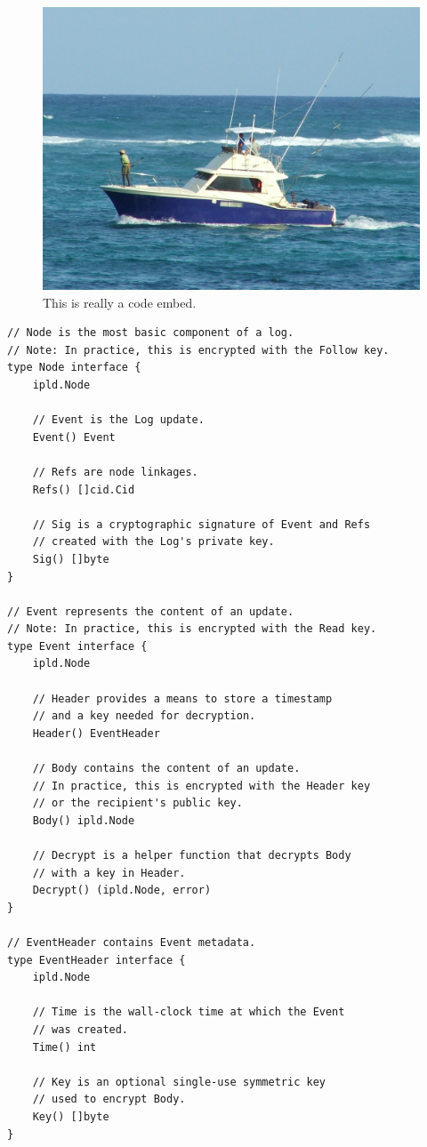 \documentclass{comjnl}
\begin{document}
\begin{figure}
  \includegraphics[width=\linewidth]{boat.jpg}
  \caption{This is really a code embed.}
  \label{fig:boat1}
\end{figure}

\begin{lstlisting}
// Node is the most basic component of a log.
// Note: In practice, this is encrypted with the Follow key.
type Node interface {
    ipld.Node

    // Event is the Log update.
    Event() Event

    // Refs are node linkages.
    Refs() []cid.Cid

    // Sig is a cryptographic signature of Event and Refs
    // created with the Log's private key.
    Sig() []byte
}

// Event represents the content of an update.
// Note: In practice, this is encrypted with the Read key.
type Event interface {
    ipld.Node

    // Header provides a means to store a timestamp
    // and a key needed for decryption.
    Header() EventHeader

    // Body contains the content of an update.
    // In practice, this is encrypted with the Header key
    // or the recipient's public key.
    Body() ipld.Node

    // Decrypt is a helper function that decrypts Body
    // with a key in Header.
    Decrypt() (ipld.Node, error)
}

// EventHeader contains Event metadata.
type EventHeader interface {
    ipld.Node

    // Time is the wall-clock time at which the Event
    // was created.
    Time() int

    // Key is an optional single-use symmetric key
    // used to encrypt Body.
    Key() []byte
}
\end{lstlisting}
\end{document}
